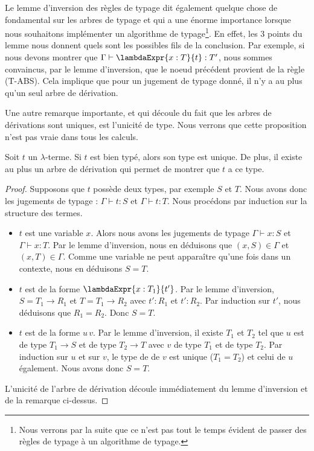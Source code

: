 Le lemme d'inversion des règles de typage dit également quelque chose de
fondamental sur les arbres de typage et qui a une énorme importance lorsque
nous souhaitons implémenter un algorithme de typage\footnote{Nous verrons par la
suite que ce n'est pas tout le temps évident de passer des règles de typage à un
algorithme de typage.}. En effet, les 3 points du
lemme nous donnent quels sont les possibles fils de la conclusion. Par
exemple, si nous devons montrer que $\Gamma \vdash \lambdaExpr{x : T}{t} : T'$,
nous sommes convaincus, par le lemme d'inversion, que le noeud précédent
provient de la règle (T-ABS). Cela implique que pour un jugement de typage
donné, il n'y a au plus qu'un seul arbre de dérivation.

Une autre remarque importante, et qui découle du fait que les arbres de
dérivations sont uniques, est l'unicité de type. Nous verrons que cette
proposition n'est pas vraie dans tous les calculs.

\begin{theorem} 
  \label{thm:simply-typed-lambda-calculus-type-unicity}
  Soit $t$ un $\lambda$-terme. Si $t$ est bien typé, alors son type est unique.
  De plus, il existe au plus un arbre de dérivation qui permet de montrer que $t$
  a ce type.
\end{theorem}

\begin{proof}
  \label{proof:simply-typed-lambda-calculus-type-unicity}
  Supposons que $t$ possède deux types, par exemple $S$ et $T$. Nous avons donc les
  jugements de typage : $\Gamma \vdash t : S$ et $\Gamma \vdash t : T$. Nous procédons
  par induction sur la structure des termes.
  \begin{itemize}
   \item $t$ est une variable $x$. Alors nous avons les jugements de typage
     $\Gamma \vdash x : S$ et $\Gamma \vdash x : T$. Par le lemme d'inversion, nous
     en déduisons que $(x, S) \in
     \Gamma$ et $(x, T) \in \Gamma$. Comme une variable ne peut apparaître
     qu'une fois dans un contexte, nous en déduisons $S = T$.

   \item $t$ est de la forme $\lambdaExpr{x : T_{1}}{t'}$. Par le lemme
     d'inversion, $S = T_{1} \rightarrow R_{1}$ et $T = T_{1} \rightarrow
     R_{2}$ avec $t' : R_{1}$ et $t' : R_{2}$. Par induction sur $t'$, nous
     déduisons que $R_{1} = R_{2}$. Donc $S = T$.

   \item $t$ est de la forme $u \, v$. Par le lemme d'inversion, il existe
     $T_{1}$ et $T_{2}$ tel que $u$ est de type $T_{1} \rightarrow S$ et de type $T_{2}
     \rightarrow T$ avec $v$ de type $T_{1}$ et de type $T_{2}$. Par induction
     sur $u$ et sur $v$, le type de de $v$ est unique ($T_{1} = T_{2}$) et celui
     de $u$ également. Nous avons donc $S = T$.
   \end{itemize}

   L'unicité de l'arbre de dérivation découle immédiatement du lemme d'inversion
   et de la remarque ci-dessus.
\end{proof}


